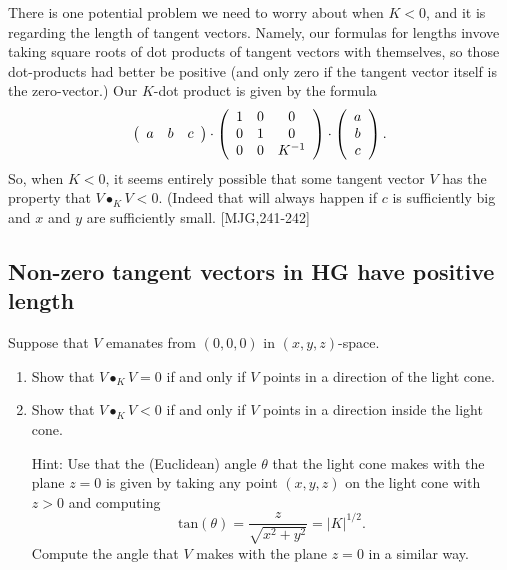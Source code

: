 \documentclass{ximera}
\begin{document}
There is one potential problem we need to worry about when $K<0$, and it is
regarding the length of tangent vectors. Namely, our formulas for lengths
invove taking square roots of dot products of tangent vectors with themselves,
so those dot-products had better be positive (and only zero if the tangent
vector itself is the zero-vector.) Our $K$-dot product is given by the formula%
\[
\left(
\begin{array}
[c]{ccc}%
a & b & c
\end{array}
\right)  \cdot\left(
\begin{array}
[c]{ccc}%
1 & 0 & 0\\
0 & 1 & 0\\
0 & 0 & K^{-1}%
\end{array}
\right)  \cdot\left(
\begin{array}
[c]{c}%
a\\
b\\
c
\end{array}
\right)  .
\]
So, when $K<0$, it seems entirely possible that some tangent vector $V$ has
the property that $V\bullet_{K}V<0$. (Indeed that will always happen if $c$ is
sufficiently big and $x$ and $y$ are sufficiently small.
[MJG,241-242]

\subsection*{Non-zero tangent vectors in \textbf{HG} have positive length}

\begin{exercise}
Suppose that $V$ emanates from $\left(  0,0,0\right)  $ in $\left(
x,y,z\right)  $-space.
\begin{enumerate}
\item Show that $V\bullet_{K}V=0$ if and only if $V$ points in a direction of the
light cone.

\item Show that $V\bullet_{K}V<0$ if and only if $V$ points in a direction inside
the light cone.

Hint: Use that the (Euclidean) angle $\theta$ that the light cone makes with
the plane $z=0$ is given by taking any point $\left(  x,y,z\right)  $ on the
light cone with $z>0$ and computing%
\[
\mathrm{tan}\left(  \theta\right)  =\frac{z}{\sqrt{x^{2}+y^{2}}}=\left\vert
K\right\vert ^{1/2}.
\]
Compute the angle that $V$ makes with the plane $z=0$ in a similar way.
\end{enumerate}
\end{exercise}
\end{document}
